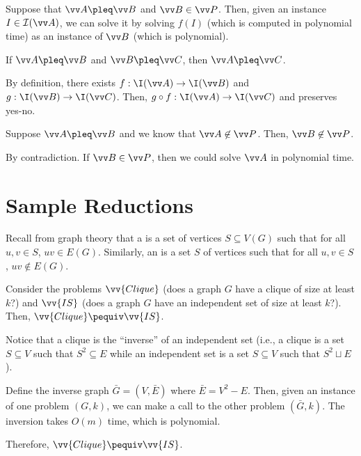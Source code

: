 Suppose that $\vv A \pleq \vv B$ and $\vv B \in \vv P$.
Then, given an instance $I \in \mathcal I(\vv A)$,
we can solve it by solving $f(I)$ (which is computed in polynomial time)
as an instance of $\vv B$ (which is polynomial).

\begin{lemma}
  If $\vv A \pleq \vv B$ and $\vv B \pleq \vv C$,
  then $\vv A \pleq \vv C$.
\end{lemma}
\begin{prf}
  By definition, there exists $f : \I(\vv A) \to \I(\vv B)$
  and $g : \I(\vv B) \to \I(\vv C)$.
  Then, $g \circ f : \I(\vv A) \to \I(\vv C)$ and preserves yes-no.
\end{prf}

\begin{lemma}
  Suppose $\vv A \pleq \vv B$ and we know that $\vv A \not\in \vv P$.
  Then, $\vv B \not\in \vv P$.
\end{lemma}
\begin{prf}
  By contradiction.
  If $\vv B \in \vv P$, then we could solve $\vv A$ in polynomial time.
\end{prf}

\section{Sample Reductions}

Recall from graph theory that a  is a set of vertices $S \subseteq V(G)$
such that for all $u, v \in S$, $uv \in E(G)$.
Similarly, an  is a set $S$ of vertices such that
for all $u, v \in S$, $uv \not\in E(G)$.

\begin{prop}
  Consider the problems $\vv{Clique}$ (does a graph $G$ have a clique of size at least $k$?)\@
  and $\vv{IS}$ (does a graph $G$ have an independent set of size at least $k$?).
  Then, $\vv{Clique} \pequiv \vv{IS}$.
\end{prop}
\begin{prf}
  Notice that a clique is the ``inverse'' of an independent set
  (i.e., a clique is a set $S \subseteq V$ such that $S^2 \subseteq E$
  while an independent set is a set $S \subseteq V$ such that $S^2 \sqcup E$).

  Define the inverse graph $\bar G = (V, \bar E)$ where $\bar E = V^2 - E$.
  Then, given an instance of one problem $(G,k)$,
  we can make a call to the other problem $(\bar G,k)$.
  The inversion takes $O(m)$ time, which is polynomial.

  Therefore, $\vv{Clique} \pequiv \vv{IS}$.
\end{prf}

